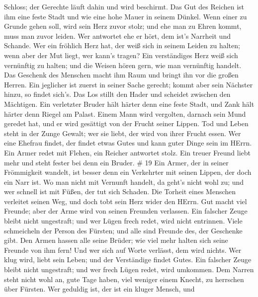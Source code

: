 Schloss; der Gerechte läuft dahin und wird beschirmt.  Das
Gut des Reichen ist ihm eine feste Stadt und wie eine hohe Mauer in
seinem Dünkel.  Wenn einer zu Grunde gehen soll, wird sein
Herz zuvor stolz; und ehe man zu Ehren kommt, muss man zuvor leiden.
 Wer antwortet ehe er hört, dem ist's Narrheit und Schande.
 Wer ein fröhlich Herz hat, der weiß sich in seinem Leiden
zu halten; wenn aber der Mut liegt, wer kann's tragen?  Ein
verständiges Herz weiß sich vernünftig zu halten; und die Weisen hören
gern, wie man vernünftig handelt.  Das Geschenk des
Menschen macht ihm Raum und bringt ihn vor die großen Herren.
 Ein jeglicher ist zuerst in seiner Sache gerecht; kommt
aber sein Nächster hinzu, so findet sich's.  Das Los stillt
den Hader und scheidet zwischen den Mächtigen.  Ein
verletzter Bruder hält härter denn eine feste Stadt, und Zank hält
härter denn Riegel am Palast.  Einem Mann wird vergolten,
darnach sein Mund geredet hat, und er wird gesättigt von der Frucht
seiner Lippen.  Tod und Leben steht in der Zunge Gewalt;
wer sie liebt, der wird von ihrer Frucht essen.  Wer eine
Ehefrau findet, der findet etwas Gutes und kann guter Dinge sein im
HErrn.  Ein Armer redet mit Flehen, ein Reicher antwortet
stolz.  Ein treuer Freund liebt mehr und steht fester bei
denn ein Bruder. \# 19  Ein Armer, der in seiner Frömmigkeit
wandelt, ist besser denn ein Verkehrter mit seinen Lippen, der doch ein
Narr ist.  Wo man nicht mit Vernunft handelt, da geht's
nicht wohl zu; und wer schnell ist mit Füßen, der tut sich Schaden.
 Die Torheit eines Menschen verleitet seinen Weg, und doch
tobt sein Herz wider den HErrn.  Gut macht viel Freunde;
aber der Arme wird von seinen Freunden verlassen.  Ein
falscher Zeuge bleibt nicht ungestraft; und wer Lügen frech redet, wird
nicht entrinnen.  Viele schmeicheln der Person des Fürsten;
und alle sind Freunde des, der Geschenke gibt.  Den Armen
hassen alle seine Brüder; wie viel mehr halten sich seine Freunde von
ihm fern! Und wer sich auf Worte verlässt, dem wird nichts. 
Wer klug wird, liebt sein Leben; und der Verständige findet Gutes.
 Ein falscher Zeuge bleibt nicht ungestraft; und wer frech
Lügen redet, wird umkommen.  Dem Narren steht nicht wohl
an, gute Tage haben, viel weniger einem Knecht, zu herrschen über
Fürsten.  Wer geduldig ist, der ist ein kluger Mensch, und
